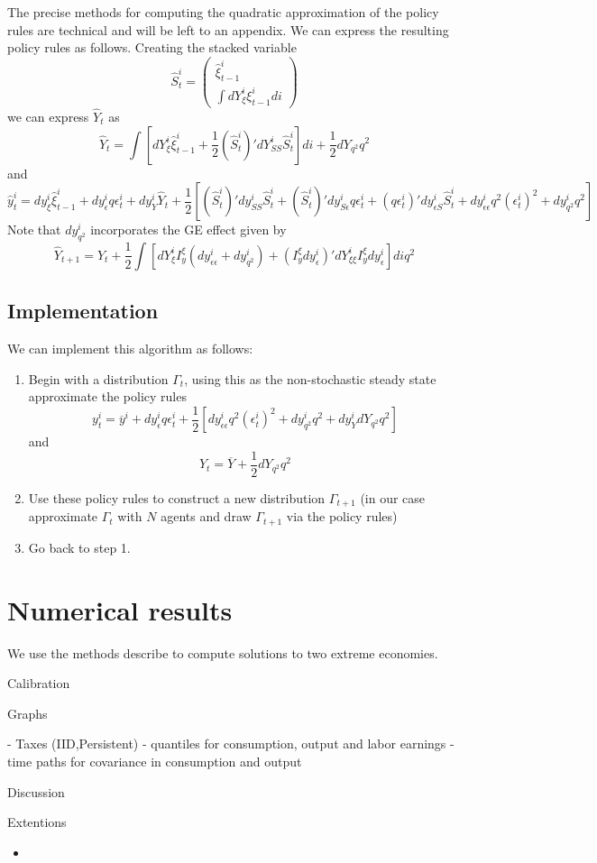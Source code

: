 \documentclass[thmsb,11pt]{article}
\newcommand{\bmat}{\begin{matrix}}
\newcommand{\emat}{\end{matrix}}
\begin{document}
The precise methods for computing the quadratic approximation of the policy rules are technical and will be left to an appendix.  We can express the resulting policy rules as follows.  Creating the stacked variable 
\[
	\hat S^i_t = \left(\bmat \hat \xi^i_{t-1}\\ \int dY^i_\xi \xi^i_{t-1}di\emat\right)
\]we can express $\hat Y_t$ as 
\begin{equation}
	\hat Y_t = \int\left[ dY^i_\xi \hat \xi^i_{t-1} + \frac12(\hat S^i_t)' dY^i_{SS}\hat S^i_t \right]di + \frac12 dY_{q^2} q^2
\end{equation} and 
\begin{equation}
	\hat y^i_t = dy^i_\xi \hat \xi^i_{t-1} + dy^i_\epsilon q\epsilon^i_t + dy^i_Y \hat Y_t  + \frac12\left[ (\hat S^i_t)' dy^i_{SS} \hat S^i_t + (\hat S^i_t)' dy^i_{S\epsilon}q\epsilon^i_t + (q\epsilon^i_t)' dy^i_{\epsilon S} \hat S^i_t + dy^i_{\epsilon\epsilon}q^2(\epsilon^i_t)^2 + dy^i_{q^2}q^2  \right]
\end{equation}  Note that  $dy^i_{q^2}$ incorporates the GE effect given by
\[
	\hat Y_{t+1} = \hat Y_t +\frac{1}{2} \int\left[ dY^i_\xi I^\xi_y(dy^i_{\epsilon\epsilon}+dy^i_{q^2}) + (I^\xi_y dy^i_\epsilon)'dY^i_{\xi\xi}I^\xi_y dy^i_\epsilon \right]di q^2
\]
\subsection{Implementation}
We can implement this algorithm as follows:
\begin{enumerate}
\item  Begin with a distribution $\Gamma_t$, using this as the non-stochastic steady state approximate the policy rules
\[
y^i_t = \overline y^i +  dy^i_\epsilon q\epsilon^i_t + \frac12\left[dy^i_{\epsilon\epsilon}q^2(\epsilon^i_t)^2 + dy^i_{q^2}q^2 + dy^i_YdY_{q^2} q^2\right]
\]and 
\[
	Y_t = \overline Y + \frac12 dY_{q^2}q^2
\]
\item  Use these policy rules to construct a new distribution $\Gamma_{t+1}$ (in our case approximate $\Gamma_t$ with $N$ agents and draw $\Gamma_{t+1}$ via the policy rules)
\item  Go back to step 1.
\end{enumerate}
  \section{Numerical results}  
We use the methods describe to compute solutions to two extreme economies. 

Calibration  

Graphs

- Taxes (IID,Persistent)
- quantiles for consumption, output and labor earnings
- time paths for covariance in consumption and output




Discussion



Extentions









  \begin{itemize}
  \item 
  \end{itemize}
\end{document}
